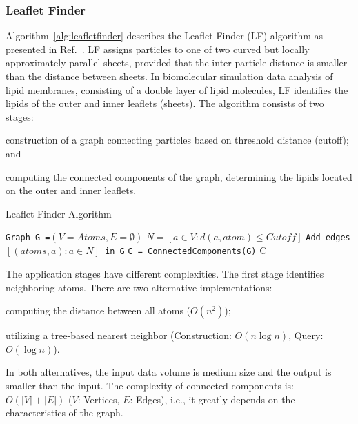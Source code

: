 \subsubsection*{Leaflet Finder}

Algorithm~\ref{alg:leafletfinder} describes the Leaflet Finder (LF) algorithm as
presented in Ref.~\cite{michaud2011mdanalysis}. LF assigns particles to one of
two curved but locally approximately parallel sheets, provided that the
inter-particle distance is smaller than the distance between sheets. In
biomolecular simulation data analysis of lipid membranes, consisting of a double
layer of lipid molecules, LF identifies the lipids of the outer and inner
leaflets (sheets). The algorithm consists of two stages:
\begin{inparaenum}[a)]
    \item construction of a graph connecting particles based on threshold
    distance (cutoff); and
    \item computing the connected components of the graph, determining the
    lipids located on the outer and inner leaflets.
\end{inparaenum}

\begin{algorithm}[t]
    \scriptsize
    \caption{Leaflet Finder Algorithm}
    \label{alg:leafletfinder}
    \begin{algorithmic}[1]
        \State \texttt{Graph G =$(V=Atoms,E=\emptyset)$}
        \State \texttt{$N = [a\in V: d(a,atom)\le Cutoff]$}
        \State \texttt{Add edges $[(atoms,a): a \in N]$ in G}
        \EndFor
        \State \texttt{C = ConnectedComponents(G)}
        \State \Return C
        \EndProcedure
    \end{algorithmic}
\end{algorithm}

The application stages have different complexities. The first stage identifies
neighboring atoms. There are two alternative implementations:
\begin{inparaenum}[i)]
    \item computing the distance between all atoms ($O(n^2)$);
    \item utilizing a tree-based nearest neighbor (Construction: $O(n\log n)$,
    Query: $O(\log n)$).
\end{inparaenum}
In both alternatives, the input data volume is medium size and the output is
smaller than the input. The complexity of connected components is: $O(|V|+|E|)$
($V$: Vertices, $E$: Edges), i.e., it greatly depends on the characteristics of
the graph.

